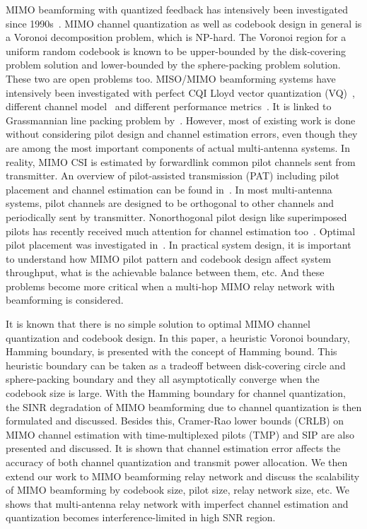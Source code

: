 \documentclass[10pt,fleqn, twocolumn]{IEEEtran}
\begin{document}
MIMO beamforming with quantized feedback has intensively been
investigated since 1990s~\cite{Gerlach94}. MIMO channel
quantization as well as codebook design in general is a Voronoi
decomposition problem, which is NP-hard. The Voronoi region for a
uniform random codebook is known to be upper-bounded by the
disk-covering problem solution and lower-bounded by the
sphere-packing problem solution. These two are open problems too.
MISO/MIMO beamforming systems have intensively been investigated
with perfect CQI Lloyd vector quantization (VQ)~\cite{Narula98},
different channel model~\cite{Mukka03} and different performance
metrics~\cite{PXia04,Roh04}. It is linked to Grassmannian line
packing problem by~\cite{Love02}. However, most of existing work
is done without considering pilot design and channel estimation
errors, even though they are among the most important components
of actual multi-antenna systems. In reality, MIMO CSI is estimated
by forwardlink common pilot channels sent from transmitter. An
overview of pilot-assisted transmission (PAT) including pilot
placement and channel estimation can be found in~\cite{Tong04}. In
most multi-antenna systems, pilot channels are designed to be
orthogonal to other channels and periodically sent by transmitter.
Nonorthogonal pilot design like superimposed pilots has recently
received much attention for channel estimation
too~\cite{Coldrey06}. Optimal pilot placement was investigated
in~\cite{Dong02}. In practical system design, it is important to
understand how MIMO pilot pattern and codebook design affect
system throughput, what is the achievable balance between them,
etc. And these problems become more critical when a multi-hop MIMO
relay network with beamforming is considered.

It is known that there is no simple solution to optimal MIMO
channel quantization and codebook design. In this paper, a
heuristic Voronoi boundary, Hamming boundary, is presented with
the concept of Hamming bound. This heuristic boundary can be taken
as a tradeoff between disk-covering circle and sphere-packing
boundary and they all asymptotically converge when the codebook
size is large. With the Hamming boundary for channel quantization,
the SINR degradation of MIMO beamforming due to channel
quantization is then formulated and discussed. Besides this,
Cramer-Rao lower bounds (CRLB) on MIMO channel estimation with
time-multiplexed pilots (TMP) and SIP are also presented and
discussed. It is shown that channel estimation error affects the
accuracy of both channel quantization and transmit power
allocation. We then extend our work to MIMO beamforming relay
network and discuss the scalability of MIMO beamforming by
codebook size, pilot size, relay network size, etc. We shows that
multi-antenna relay network with imperfect channel estimation and
quantization becomes interference-limited in high SNR region.
\end{document}
